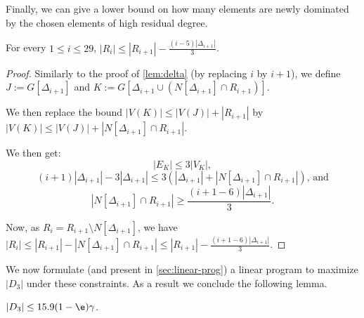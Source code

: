 Finally, we can give a lower bound on how many elements are newly
dominated by the chosen elements of high residual degree.

\begin{lemma}\label{lem:h2}
  For every $1\leq i\leq 29$, $|R_i| \le |R_{i+1}| - \frac{(i-5)|\Delta_{i+1}|}{3}$.
\end{lemma}


\begin{proof}
  Similarly to the proof of \cref{lem:delta} (by replacing $i$ by
  $i+1$), we define $J := G[\Delta_{i+1}]$ and
  $K:= G[\Delta_{i+1} \cup (N[\Delta_{i+1}]\cap R_{i+1})]$.

  We then
  replace the bound $|V(K)| \le |V(J)| + |R_{i+1}|$ by
  $|V(K)| \le |V(J)| + |N[\Delta_{i+1}]\cap R_{i+1}|$.

  We then get:
  \[|E_K| \leq 3 |V_K|, \]
  \[(i+1)|\Delta_{i+1}| - 3|\Delta_{i+1}| \leq 3(|\Delta_{i+1}| +
    |N[\Delta_{i+1}]\cap R_{i+1}|)\text{, and}\]
  \[ |N[\Delta_{i+1}]\cap R_{i+1}| \geq \frac{(i+1-6)|\Delta_{i+1}|}{3}.\]

  Now, as $R_i = R_{i+1} \setminus N[\Delta_{i+1}]$, we have
  $|R_i| \le |R_{i+1}| - |N[\Delta_{i+1}]\cap R_{i+1}|\leq |R_{i+1}| -
  \frac{(i+1-6)|\Delta_{i+1}|}{3}$.
\end{proof}

We now formulate (and present in \cref{sec:linear-prog}) a linear program to
maximize $|D_3|$ under these constraints. As a result we conclude the
following lemma.

\begin{lemma}\label{lem:size-D3}
  $|D_3|\le 15.9(1-\e)\gamma$.
\end{lemma}








